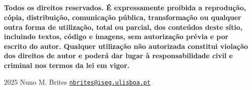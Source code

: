 \documentclass[
  11pt,
  a4paper,
]{book}
\theoremstyle{definition}
\theoremstyle{definition}
\theoremstyle{definition}
\theoremstyle{definition}
\theoremstyle{remark}
\begin{document}
\vfill

\(\,\)

\(\,\)

\(\,\)

\(\,\)

\textbf{Todos os direitos reservados. É expressamente proibida a reprodução, cópia, distribuição, comunicação pública, transformação ou qualquer outra forma de utilização, total ou parcial, dos conteúdos deste sítio, incluindo textos, código e imagens, sem autorização prévia e por escrito do autor. Qualquer utilização não autorizada constitui violação dos direitos de autor e poderá dar lugar à responsabilidade civil e criminal nos termos da lei em vigor.}

2025 \textbar{} Nuno M. Brites \textbar{}
\href{mailto:nbrites@iseg.ulisboa.pt}{\nolinkurl{nbrites@iseg.ulisboa.pt}}
\end{document}
